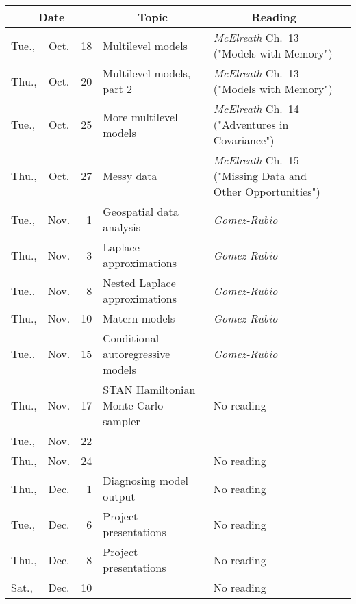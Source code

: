 \documentclass[11pt,twoside]{jgsyllabus}\usepackage[]{graphicx}\usepackage[]{xcolor}
\begin{document}
\begin{center}
\begin{tabular}{l@{~}c@{~}r>{\raggedright}m{2.6in}>{\centering}m{2in}c}
  \toprule
  \multicolumn{3}{c}{\bfseries Date} & \multicolumn{1}{c}{\bfseries Topic} &\multicolumn{1}{c}{\bfseries Reading} &\\
 \midrule
Tue., & Oct. &  18 & Multilevel models & \emph{McElreath\/} Ch.~13 ("Models with Memory") &  \\ 
   \midrule
Thu., & Oct. &  20 & Multilevel models, part 2 & \emph{McElreath\/} Ch.~13 ("Models with Memory") &  \\ 
   \midrule
Tue., & Oct. &  25 & More multilevel models & \emph{McElreath\/} Ch.~14 ("Adventures in Covariance") &  \\ 
   \midrule
Thu., & Oct. &  27 & Messy data & \emph{McElreath\/} Ch.~15 ("Missing Data and Other Opportunities") &  \\ 
   \midrule
Tue., & Nov. &   1 & Geospatial data analysis & \emph{Gomez-Rubio\/} &  \\ 
   \midrule
Thu., & Nov. &   3 & Laplace approximations & \emph{Gomez-Rubio\/} &  \\ 
   \midrule
Tue., & Nov. &   8 & Nested Laplace approximations & \emph{Gomez-Rubio\/} &  \\ 
   \midrule
Thu., & Nov. &  10 & Matern models & \emph{Gomez-Rubio\/} &  \\ 
   \midrule
Tue., & Nov. &  15 & Conditional autoregressive models & \emph{Gomez-Rubio\/} &  \\ 
   \midrule
Thu., & Nov. &  17 & STAN Hamiltonian Monte Carlo sampler & No reading &  \\ 
   \midrule
Tue., & Nov. &  22 & \multicolumn{2}{l}{\multirow{3}{*}{\bfseries\scshape\Large Thanksgiving Break}} & \\%
  Thu., & Nov. &  24 &  & No reading &  \\ 
   \midrule
Thu., & Dec. &   1 & Diagnosing model output & No reading &  \\ 
   \midrule
Tue., & Dec. &   6 & Project presentations & No reading &  \\ 
   \midrule
Thu., & Dec. &   8 & Project presentations & No reading &  \\ 
   \midrule
Sat., & Dec. &  10 &  & No reading &  \\ 
   \bottomrule
\end{tabular}

\end{center}
%
\end{document}
